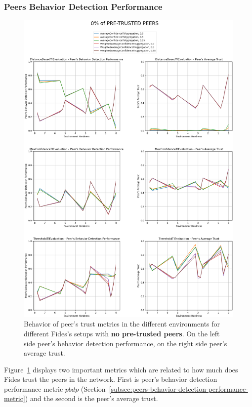\cleartoleftpage
\subsubsection{Peers Behavior Detection Performance}
\begin{figure}[hp]
    \centering
    \includegraphics[width=1.0\textwidth]{assets/0_peer_trust.png}
    \caption{Behavior of peer's trust metrics in the different environments for different Fides's setups with \textbf{no pre-trusted peers}. On the left side peer's behavior detection performance, on the right side peer's average trust.}
    \label{fig:0-peer-trust}
\end{figure}

Figure~\ref{fig:0-peer-trust} displays two important metrics which are related to how much does Fides trust the peers in the network. First is peer's behavior detection performance metric $pbdp$ (Section~\ref{subsec:peers-behavior-detection-performance-metric}) and the second is the peer's average trust.

